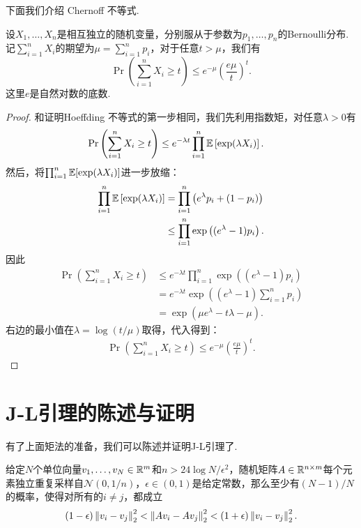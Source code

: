下面我们介绍 Chernoff 不等式. 
\begin{theorem}\label{thm:chernoff-inequality}
    设$X_1, \dots, X_n$是相互独立的随机变量，分别服从于参数为$p_1, \dots, p_n$的Bernoulli分布.  记$\sum_{i=1}^n X_i$的期望为$\mu = \sum_{i=1}^n p_i$，对于任意$t > \mu$，我们有
    \[
        \Pr\left( \sum_{i=1}^n X_i \geq t\right) \leq e^{-\mu} \left(\frac{e\mu}{t}\right)^t.  
    \]
    这里$e$是自然对数的底数.
\end{theorem}

\begin{proof}
和证明Hoeffding 不等式的第一步相同，我们先利用指数矩，对任意$\lambda > 0$有
    \[
    \begin{aligned}
        \Pr\left( \sum_{i=1}^n X_i \geq t\right) &\leq e^{-\lambda t}\prod_{i=1}^n \mathbb{E}\left[\exp (\lambda X_i)\right].
    \end{aligned}
    \]
然后，将$\prod_{i=1}^n\mathbb{E}[\exp (\lambda X_i)]$进一步放缩：
    \[
    \begin{aligned}
        \prod_{i=1}^n \mathbb{E} \left[\exp (\lambda X_i)\right]&= \prod_{i=1}^n \left(e^\lambda p_i + (1 - p_i) \right) \\
         &\leq \prod_{i=1}^n \exp\left((e^\lambda -1)p_i \right). \\
    \end{aligned}
    \]
因此
    \[
    \begin{aligned}
        \Pr\left( \sum_{i=1}^n X_i \geq t\right) &\leq e^{-\lambda t}\prod_{i=1}^n \exp\left((e^\lambda -1)p_i \right) \\
        &= e^{-\lambda t} \exp\left((e^\lambda -1)\sum_{i=1}^n p_i \right)\\
        &=\exp\left(\mu e^\lambda -t\lambda-\mu \right).
    \end{aligned}
    \]
右边的最小值在$\lambda = \log (t/\mu)$取得，代入得到：
    \[
    \begin{aligned}
        \Pr\left( \sum_{i=1}^n X_i \geq t\right) \leq e^{-\mu} \left(\frac{e\mu}{t}\right)^t.
    \end{aligned}
    \]
\end{proof}

\section{J-L引理的陈述与证明}
有了上面矩法的准备，我们可以陈述并证明J-L引理了.
\begin{theorem}\label{thm:johnson-lindenstrauss-lemma}
给定$N$个单位向量$v_1,\dots,v_N\in\mathbb{R}^m$和$n >24\log N/\epsilon^2$，随机矩阵$A\in \mathbb{R}^{n\times m}$每个元素独立重复采样自$\mathcal N(0,1/n)$，$\epsilon \in (0,1)$是给定常数，那么至少有$(N-1)/N$的概率，使得对所有的$i\neq j$，都成立
    \[
        (1 - \epsilon)\left\|v_i-v_j\right\|_2^2 <\left\|Av_i-Av_j\right\|_2^2 < (1 + \epsilon)\left\|v_i-v_j\right\|_2^2.
    \]
\end{theorem}

